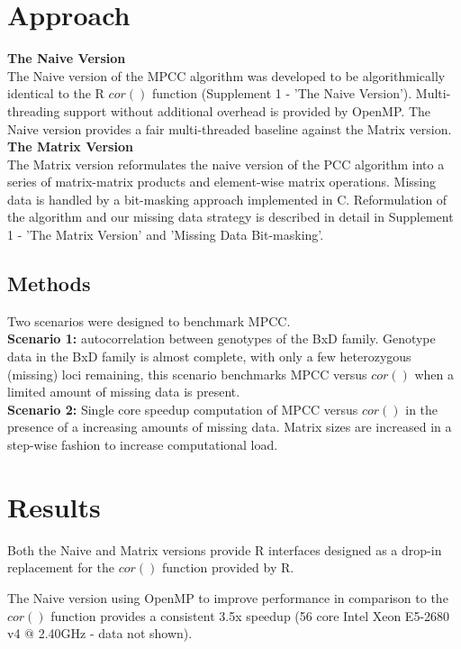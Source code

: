 \documentclass{bioinfo}
\begin{document}
\section{Approach}
\textbf{The Naive Version}\\
The Naive version of the MPCC algorithm was developed to be algorithmically identical 
to the R $cor()$ function (Supplement 1 - 'The Naive Version'). Multi-threading 
support without additional overhead is provided by OpenMP. The Naive version 
provides a fair multi-threaded baseline against the Matrix version.\\
\textbf{The Matrix Version}\\
The Matrix version reformulates the naive version of the PCC algorithm 
into a series of matrix-matrix products and element-wise matrix operations. 
Missing data is handled by a bit-masking approach implemented in C. 
Reformulation of the algorithm and our missing data strategy is described 
in detail in Supplement 1 - 'The Matrix Version' and 'Missing Data Bit-masking'. 
\vspace*{-5mm}
\begin{methods}
\section{Methods}
Two scenarios were designed to benchmark MPCC.\\
{\bf Scenario 1:} autocorrelation between genotypes of the BxD family. 
Genotype data in the BxD family is almost complete, with only a few heterozygous 
(missing) loci remaining, this scenario benchmarks MPCC versus $cor()$ when a limited 
amount of missing data is present.\\
{\bf Scenario 2:} Single core speedup computation of MPCC versus $cor()$ in the 
presence of a increasing amounts of missing data. Matrix sizes are increased in a 
step-wise fashion to increase computational load.
\end{methods}
\vspace*{-2mm}
\section{Results}
Both the Naive and Matrix versions provide R interfaces designed as a drop-in 
replacement for the $cor()$ function provided by R.

The Naive version using OpenMP to improve performance in comparison to the 
$cor()$ function provides a consistent 3.5x speedup (56 core Intel Xeon E5-2680 
v4 $@$ 2.40GHz - data not shown).
\end{document}
